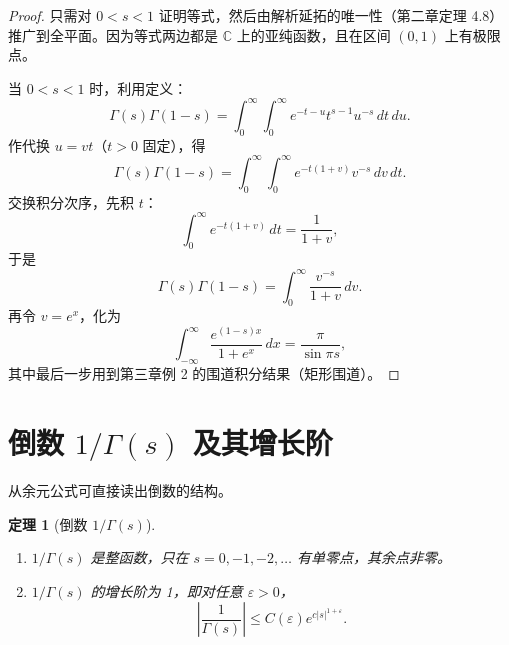 \documentclass[UTF8]{ctexart}
\newtheorem{theorem}{定理}[section]
\numberwithin{equation}{section}
\newcommand{\CC}{\mathbb{C}}
\begin{document}
\begin{proof}
只需对 \(0<s<1\) 证明等式，然后由解析延拓的唯一性（第二章定理 4.8）推广到全平面。因为等式两边都是 \(\CC\) 上的亚纯函数，且在区间 \((0,1)\) 上有极限点。

当 \(0<s<1\) 时，利用定义：
\[
\Gamma(s)\Gamma(1-s)=\int_{0}^{\infty}\int_{0}^{\infty} e^{-t-u} t^{s-1}u^{-s}\, dt\, du.
\]
作代换 \(u=vt\)（\(t>0\) 固定），得
\[
\Gamma(s)\Gamma(1-s)=\int_{0}^{\infty}\int_{0}^{\infty} e^{-t(1+v)} v^{-s}\, dv\, dt.
\]
交换积分次序，先积 \(t\)：
\[
\int_{0}^{\infty} e^{-t(1+v)}\, dt = \frac{1}{1+v},
\]
于是
\[
\Gamma(s)\Gamma(1-s)=\int_{0}^{\infty} \frac{v^{-s}}{1+v}\, dv.
\]
再令 \(v=e^{x}\)，化为
\[
\int_{-\infty}^{\infty} \frac{e^{(1-s)x}}{1+e^{x}}\, dx = \frac{\pi}{\sin\pi s},
\]
其中最后一步用到第三章例 2 的围道积分结果（矩形围道）。
\end{proof}

\section{倒数 \(1/\Gamma(s)\) 及其增长阶}

从余元公式可直接读出倒数的结构。

\begin{theorem}[倒数 \(1/\Gamma(s)\)]\label{thm:RecipGamma}
\begin{enumerate}
\item \(1/\Gamma(s)\) 是整函数，只在 \(s=0,-1,-2,\dots\) 有单零点，其余点非零。
\item \(1/\Gamma(s)\) 的增长阶为 1，即对任意 \(\varepsilon>0\)，
\[
\left|\frac{1}{\Gamma(s)}\right|\le C(\varepsilon) e^{c|s|^{1+\varepsilon}}.
\]
\end{enumerate}
\end{theorem}
\end{document}
